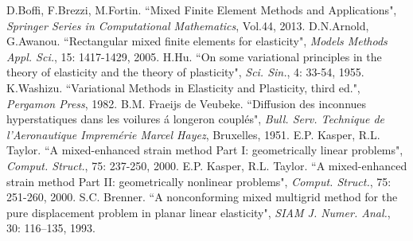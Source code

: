 \documentclass[preprint,12pt,authoryear]{elsarticle}
\begin{document}
\begin{thebibliography}{00}
 D.Boffi, F.Brezzi, M.Fortin. ``Mixed Finite Element Methods and Applications", 
{\it{Springer Series in Computational Mathematics}}, Vol.44, 2013.
 D.N.Arnold, G.Awanou. ``Rectangular mixed finite elements for elasticity", 
{\it{Models Methods Appl. Sci.}}, 15: 1417-1429, 2005.
 H.Hu. ``On some variational principles in the theory of elasticity and the theory of plasticity", 
{\it{Sci. Sin.}}, 4: 33-54, 1955.
 K.Washizu. ``Variational Methods in Elasticity and Plasticity, third ed.", 
{\it{Pergamon Press}}, 1982.
 B.M. Fraeijs de Veubeke. ``Diffusion des inconnues hyperstatiques dans les voilures á longeron couplés", {\it{Bull. Serv. Technique de l’Aeronautique Impremérie Marcel Hayez}}, Bruxelles, 1951.
 E.P. Kasper, R.L. Taylor. ``A mixed-enhanced strain method Part I: geometrically linear problems", 
{\it{Comput. Struct.}}, 75: 237-250, 2000.
 E.P. Kasper, R.L. Taylor. ``A mixed-enhanced strain method Part II: geometrically nonlinear problems", 
{\it{Comput. Struct.}}, 75: 251-260, 2000.
 S.C. Brenner. ``A nonconforming mixed multigrid method for the pure displacement problem in planar linear elasticity", 
{\it{SIAM J. Numer. Anal.}}, 30: 116–135, 1993.

\end{thebibliography}
\end{document}

